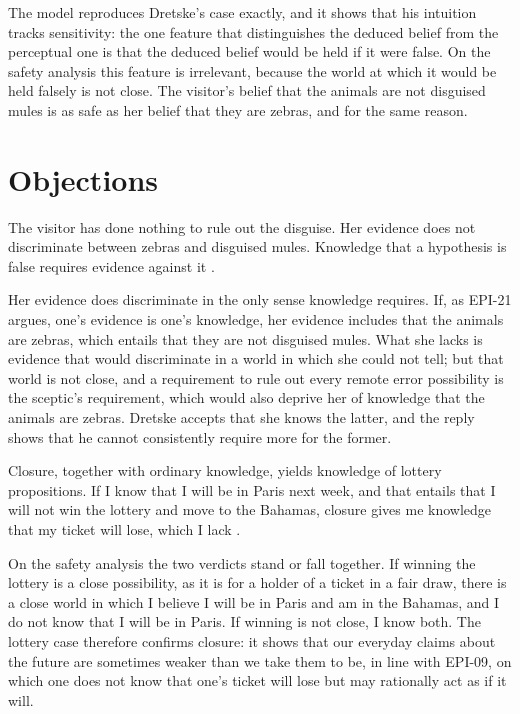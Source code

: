 \documentclass{situationist-preprint}
\begin{document}
The model reproduces Dretske's case exactly, and it shows that his intuition tracks sensitivity: the one feature that distinguishes the deduced belief from the perceptual one is that the deduced belief would be held if it were false. On the safety analysis this feature is irrelevant, because the world at which it would be held falsely is not close. The visitor's belief that the animals are not disguised mules is as safe as her belief that they are zebras, and for the same reason.

\section{Objections}

\begin{objection}
The visitor has done nothing to rule out the disguise. Her evidence does not discriminate between zebras and disguised mules. Knowledge that a hypothesis is false requires evidence against it \citep{Dretske1970}.
\end{objection}

\begin{reply}
Her evidence does discriminate in the only sense knowledge requires. If, as EPI-21 argues, one's evidence is one's knowledge, her evidence includes that the animals are zebras, which entails that they are not disguised mules. What she lacks is evidence that would discriminate in a world in which she could not tell; but that world is not close, and a requirement to rule out every remote error possibility is the sceptic's requirement, which would also deprive her of knowledge that the animals are zebras. Dretske accepts that she knows the latter, and the reply shows that he cannot consistently require more for the former.
\end{reply}

\begin{objection}[Lotteries]
Closure, together with ordinary knowledge, yields knowledge of lottery propositions. If I know that I will be in Paris next week, and that entails that I will not win the lottery and move to the Bahamas, closure gives me knowledge that my ticket will lose, which I lack \citep{Vogel1990,Hawthorne2004}.
\end{objection}

\begin{reply}
On the safety analysis the two verdicts stand or fall together. If winning the lottery is a close possibility, as it is for a holder of a ticket in a fair draw, there is a close world in which I believe I will be in Paris and am in the Bahamas, and I do not know that I will be in Paris. If winning is not close, I know both. The lottery case therefore confirms closure: it shows that our everyday claims about the future are sometimes weaker than we take them to be, in line with EPI-09, on which one does not know that one's ticket will lose but may rationally act as if it will.
\end{reply}
\end{document}
